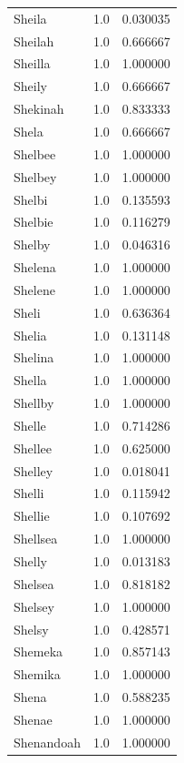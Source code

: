 \documentclass[
  letterpaper,
  DIV=11,
  numbers=noendperiod]{scrreprt}
\begin{document}
\begin{tabular}{lrr}
Sheila          &   1.0 &   0.030035 \\
Sheilah         &   1.0 &   0.666667 \\
Sheilla         &   1.0 &   1.000000 \\
Sheily          &   1.0 &   0.666667 \\
Shekinah        &   1.0 &   0.833333 \\
Shela           &   1.0 &   0.666667 \\
Shelbee         &   1.0 &   1.000000 \\
Shelbey         &   1.0 &   1.000000 \\
Shelbi          &   1.0 &   0.135593 \\
Shelbie         &   1.0 &   0.116279 \\
Shelby          &   1.0 &   0.046316 \\
Shelena         &   1.0 &   1.000000 \\
Shelene         &   1.0 &   1.000000 \\
Sheli           &   1.0 &   0.636364 \\
Shelia          &   1.0 &   0.131148 \\
Shelina         &   1.0 &   1.000000 \\
Shella          &   1.0 &   1.000000 \\
Shellby         &   1.0 &   1.000000 \\
Shelle          &   1.0 &   0.714286 \\
Shellee         &   1.0 &   0.625000 \\
Shelley         &   1.0 &   0.018041 \\
Shelli          &   1.0 &   0.115942 \\
Shellie         &   1.0 &   0.107692 \\
Shellsea        &   1.0 &   1.000000 \\
Shelly          &   1.0 &   0.013183 \\
Shelsea         &   1.0 &   0.818182 \\
Shelsey         &   1.0 &   1.000000 \\
Shelsy          &   1.0 &   0.428571 \\
Shemeka         &   1.0 &   0.857143 \\
Shemika         &   1.0 &   1.000000 \\
Shena           &   1.0 &   0.588235 \\
Shenae          &   1.0 &   1.000000 \\
Shenandoah      &   1.0 &   1.000000 \\

\end{tabular}
\end{document}
